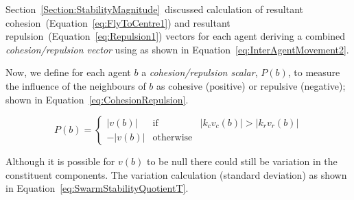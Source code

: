 \documentclass{ieeeaccess}
\begin{document}
Section~\ref{Section:StabilityMagnitude}~discussed calculation of resultant cohesion~(Equation~\ref{eq:FlyToCentre1}) and resultant repulsion~(Equation~\ref{eq:Repulsion1}) vectors for each agent deriving a combined \textit{cohesion/repulsion vector} using as shown in Equation~\ref{eq:InterAgentMovement2}. 


Now, we define for each agent $b$ a \textit{cohesion/repulsion scalar}, $P(b)$, to measure the influence of the neighbours of $b$ as cohesive (positive) or repulsive (negative); shown in Equation~\ref{eq:CohesionRepulsion}.

\begin{equation}
\label{eq:CohesionRepulsion}
P(b) = \left\{\begin{array}{lll}
               |v(b)|& \mathrm{if} & |k_cv_c(b)| > |k_r v_r(b)|\\
              -|v(b)|& \mathrm{otherwise}
              \end{array}\right.
\end{equation}

Although it is possible for $v(b)$ to be null there could still be variation in the constituent components. The variation calculation (standard deviation) as shown in Equation~\ref{eq:SwarmStabilityQuotientT}. 


\end{document}
